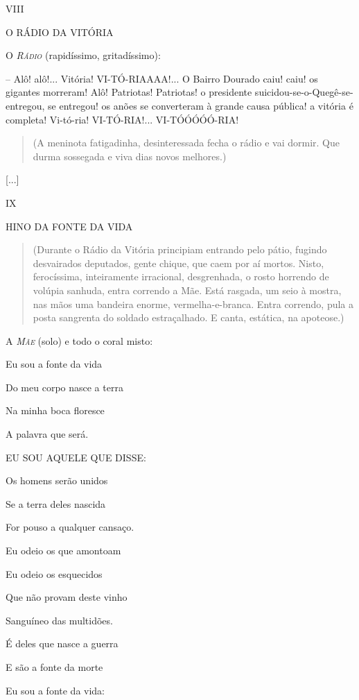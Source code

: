 VIII

O RÁDIO DA VITÓRIA

O \emph{\textsc{Rádio}} (rapidíssimo, gritadíssimo):

-- Alô! alô!... Vitória! VI-TÓ-RIAAAA!... O Bairro Dourado caiu! caiu!
os gigantes morreram! Alô! Patriotas! Patriotas! o presidente
suicidou-se-o-Quegê-se-entregou, se entregou! os anões se converteram à
grande causa pública! a vitória é completa! Vi-tó-ria! VI-TÓ-RIA!...
VI-TÓÓÓÓÓ-RIA!

\begin{quote}
(A meninota fatigadinha, desinteressada fecha o rádio e vai dormir. Que
durma sossegada e viva dias novos melhores.)
\end{quote}

{[}...{]}

IX

\textsc{HINO DA FONTE DA VIDA}

\begin{quote}
(Durante o Rádio da Vitória principiam entrando pelo pátio, fugindo
desvairados deputados, gente chique, que caem por aí mortos. Nisto,
ferocíssima, inteiramente irracional, desgrenhada, o rosto horrendo de
volúpia sanhuda, entra correndo a Mãe. Está rasgada, um seio à mostra,
nas mãos uma bandeira enorme, vermelha-e-branca. Entra correndo, pula a
posta sangrenta do soldado estraçalhado. E canta, estática, na
apoteose.)
\end{quote}

\textsc{A \emph{Mãe}} (solo) e todo o coral misto:

Eu sou a fonte da vida

Do meu corpo nasce a terra

Na minha boca floresce

A palavra que será.

EU SOU AQUELE QUE DISSE:

Os homens serão unidos

Se a terra deles nascida

For pouso a qualquer cansaço.

Eu odeio os que amontoam

Eu odeio os esquecidos

Que não provam deste vinho

Sanguíneo das multidões.

É deles que nasce a guerra

E são a fonte da morte

Eu sou a fonte da vida:

